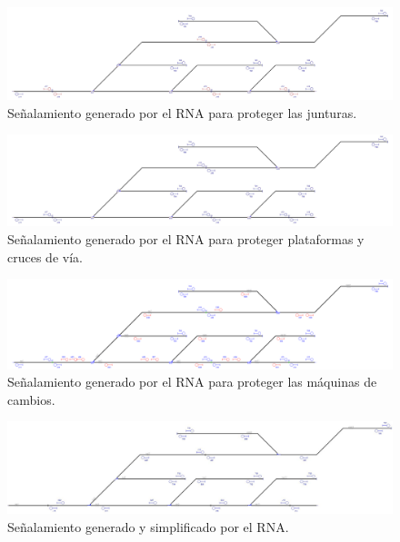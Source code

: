     \begin{figure}[h]
        \centering
        \includegraphics[width=1\textwidth]{resultados-obtenidos/ejemplo6/images/6_step2.png}
        \centering\caption{Señalamiento generado por el RNA para proteger las junturas.}
    \end{figure}

    \begin{figure}[h]
        \centering
        \includegraphics[width=1\textwidth]{resultados-obtenidos/ejemplo6/images/6_step3.png}
        \centering\caption{Señalamiento generado por el RNA para proteger plataformas y cruces de vía.}
    \end{figure}

    \begin{figure}[h]
        \centering
        \includegraphics[width=1\textwidth]{resultados-obtenidos/ejemplo6/images/6_step4.png}
        \centering\caption{Señalamiento generado por el RNA para proteger las máquinas de cambios.}
    \end{figure}

    \begin{figure}[h]
        \centering
        \includegraphics[width=1\textwidth]{resultados-obtenidos/ejemplo6/images/6_RNA.png}
        \centering\caption{Señalamiento generado y simplificado por el RNA.}
    \end{figure}
    
    
    
    
    